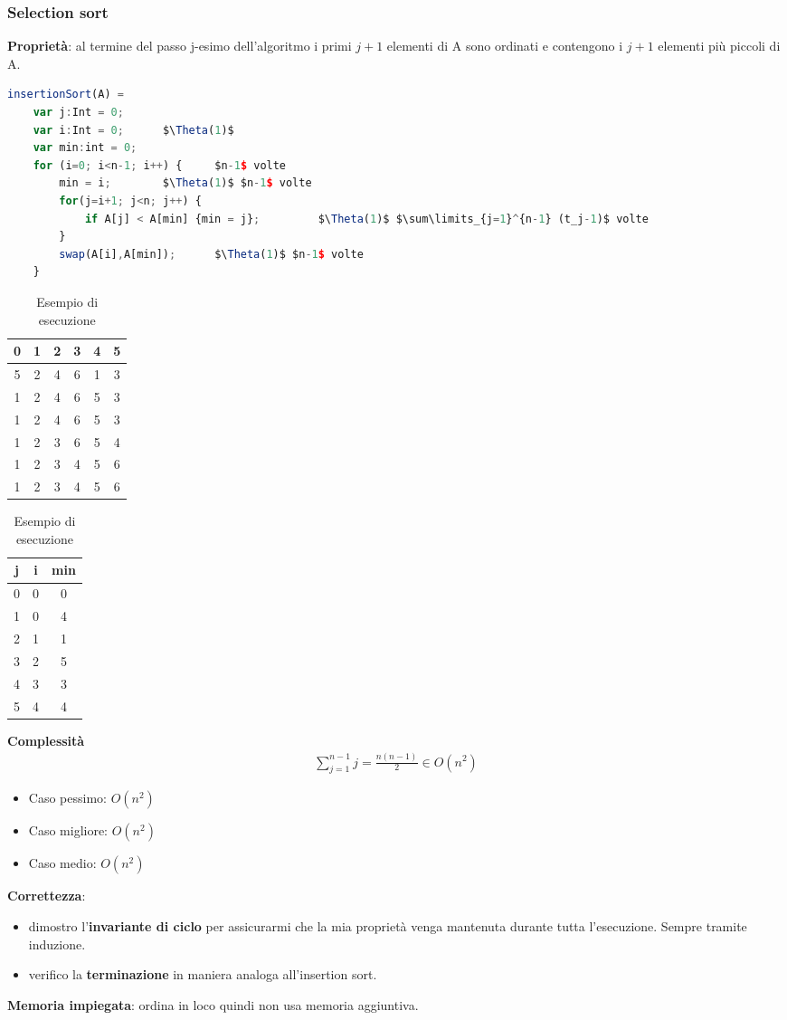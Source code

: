 \subsubsection{Selection sort}
\textbf{Proprietà}: al termine del passo j-esimo dell'algoritmo i primi $j+1$ elementi di A sono ordinati e contengono i $j+1$ elementi più piccoli di A.
\begin{lstlisting}[language=Javascript, caption=Algoritmo selection sort, mathescape=true]
	insertionSort(A) =
	var j:Int = 0;
	var i:Int = 0;		$\Theta(1)$
	var min:int = 0;
	for (i=0; i<n-1; i++) {		$n-1$ volte
		min = i;		$\Theta(1)$ $n-1$ volte
		for(j=i+1; j<n; j++) {
			if A[j] < A[min] {min = j};			$\Theta(1)$ $\sum\limits_{j=1}^{n-1} (t_j-1)$ volte
		}
		swap(A[i],A[min]);		$\Theta(1)$ $n-1$ volte
	}
\end{lstlisting}
\begin{table}[h]
	\centering
	\begin{tabular}{ |c|c|c|c|c|c| }
		\hline
		0 & 1 & 2 & 3 & 4 & 5 \\
		\hline
		5 & 2 & 4 & 6 & 1 & 3 \\
		\hline 
		1 & 2 & 4 & 6 & 5 & 3 \\
		\hline 
		1 & 2 & 4 & 6 & 5 & 3 \\
		\hline 
		1 & 2 & 3 & 6 & 5 & 4 \\
		\hline 
		1 & 2 & 3 & 4 & 5 & 6 \\
		\hline 
		1 & 2 & 3 & 4 & 5 & 6 \\
		\hline
	\end{tabular}
	\begin{tabular} { |c|c|c|}
		\hline
		j & i & min \\
		\hline
		0 & 0 & 0 \\
		\hline
		1 & 0 & 4 \\
		\hline
		2 & 1 & 1 \\
		\hline
		3 & 2 & 5 \\
		\hline
		4 & 3 & 3 \\
		\hline
		5 & 4 & 4 \\
		\hline
	\end{tabular}
	\caption{Esempio di esecuzione}
\end{table}
\textbf{Complessità}
\begin{align*}
	\sum\limits_{j=1}^{n-1} j = \frac{n(n-1)}{2} \in O(n^2)
\end{align*}
\begin{itemize}
	\item Caso pessimo: $O(n^2)$
	\item Caso migliore: $O(n^2)$
	\item Caso medio: $O(n^2)$
\end{itemize}
\textbf{Correttezza}:
\begin{itemize}
	\item dimostro l'\textbf{invariante di ciclo} per assicurarmi che la mia proprietà venga mantenuta durante tutta l'esecuzione. Sempre tramite induzione.
	\item verifico la \textbf{terminazione} in maniera analoga all'insertion sort.
\end{itemize}
\textbf{Memoria impiegata}: ordina in loco quindi non usa memoria aggiuntiva.

